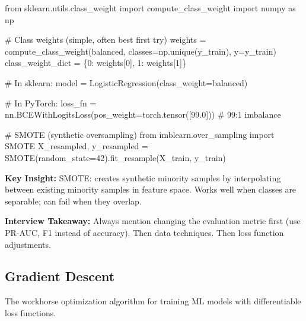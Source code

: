 \documentclass[11pt]{article}
\newenvironment{Shaded}{\begin{snugshade}}{\end{snugshade}}
\newcommand{\CommentTok}[1]{\textcolor[rgb]{0.48,0.49,0.49}{#1}}
\newcommand{\DecValTok}[1]{\textcolor[rgb]{0.96,0.45,0.00}{#1}}
\newcommand{\FloatTok}[1]{\textcolor[rgb]{0.96,0.45,0.00}{#1}}
\newcommand{\ImportTok}[1]{\textcolor[rgb]{0.15,0.68,0.38}{#1}}
\newcommand{\NormalTok}[1]{\textcolor[rgb]{0.81,0.81,0.76}{#1}}
\newcommand{\OperatorTok}[1]{\textcolor[rgb]{0.81,0.81,0.76}{#1}}
\newcommand{\StringTok}[1]{\textcolor[rgb]{0.96,0.31,0.31}{#1}}
\begin{document}
\begin{Shaded}
\begin{Highlighting}[]
\ImportTok{from}\NormalTok{ sklearn.utils.class\_weight }\ImportTok{import}\NormalTok{ compute\_class\_weight}
\ImportTok{import}\NormalTok{ numpy }\ImportTok{as}\NormalTok{ np}

\CommentTok{\# Class weights (simple, often best first try)}
\NormalTok{weights }\OperatorTok{=}\NormalTok{ compute\_class\_weight(}\StringTok{\textquotesingle{}balanced\textquotesingle{}}\NormalTok{, classes}\OperatorTok{=}\NormalTok{np.unique(y\_train), y}\OperatorTok{=}\NormalTok{y\_train)}
\NormalTok{class\_weight\_dict }\OperatorTok{=}\NormalTok{ \{}\DecValTok{0}\NormalTok{: weights[}\DecValTok{0}\NormalTok{], }\DecValTok{1}\NormalTok{: weights[}\DecValTok{1}\NormalTok{]\}}

\CommentTok{\# In sklearn:}
\NormalTok{model }\OperatorTok{=}\NormalTok{ LogisticRegression(class\_weight}\OperatorTok{=}\StringTok{\textquotesingle{}balanced\textquotesingle{}}\NormalTok{)}

\CommentTok{\# In PyTorch:}
\NormalTok{loss\_fn }\OperatorTok{=}\NormalTok{ nn.BCEWithLogitsLoss(pos\_weight}\OperatorTok{=}\NormalTok{torch.tensor([}\FloatTok{99.0}\NormalTok{]))  }\CommentTok{\# 99:1 imbalance}

\CommentTok{\# SMOTE (synthetic oversampling)}
\ImportTok{from}\NormalTok{ imblearn.over\_sampling }\ImportTok{import}\NormalTok{ SMOTE}
\NormalTok{X\_resampled, y\_resampled }\OperatorTok{=}\NormalTok{ SMOTE(random\_state}\OperatorTok{=}\DecValTok{42}\NormalTok{).fit\_resample(X\_train, y\_train)}
\end{Highlighting}
\end{Shaded}

\textbf{Key Insight:} SMOTE: creates synthetic minority samples by interpolating between existing minority samples in feature space. Works well when classes are separable; can fail when they overlap.

\textbf{Interview Takeaway:} Always mention changing the evaluation metric first (use PR-AUC, F1 instead of accuracy). Then data techniques. Then loss function adjustments.

\subsection{Gradient Descent}\label{gradient-descent}

The workhorse optimization algorithm for training ML models with differentiable loss functions.
\end{document}
